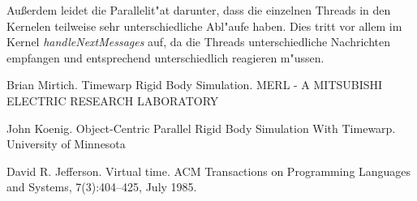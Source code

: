 \documentclass[a4paper, 10pt, openright, parskip, chapterprefix]{scrreprt}
\begin{document}
Au\ss erdem leidet die Parallelit"at darunter, dass die einzelnen Threads in den Kernelen teilweise sehr unterschiedliche Abl"aufe haben. Dies
tritt vor allem im Kernel \emph{handleNextMessages} auf, da die Threads unterschiedliche Nachrichten empfangen und entsprechend unterschiedlich
reagieren m"ussen.


\begin{thebibliography}{10}
Brian Mirtich. Timewarp Rigid Body Simulation. MERL - A MITSUBISHI ELECTRIC RESEARCH LABORATORY

John Koenig. Object-Centric Parallel Rigid Body Simulation With Timewarp. University of Minnesota

David R. Jefferson. Virtual time. ACM Transactions on Programming Languages and Systems, 7(3):404–425, July 1985.
\end{thebibliography}
\end{document}

